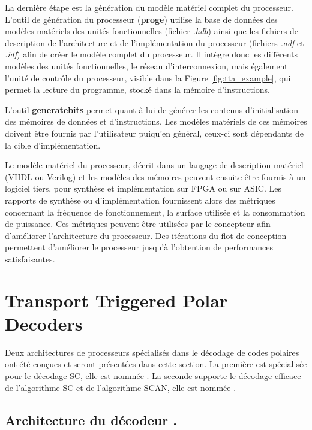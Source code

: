 La dernière étape est la génération du modèle matériel complet du processeur. L'outil de génération du processeur (\textbf{proge}) utilise la base de données des modèles matériels des unités fonctionnelles (fichier \textit{.hdb}) ainsi que les fichiers de description de l'architecture et de l'implémentation du processeur (fichiers \textit{.adf} et \textit{.idf}) afin de créer le modèle complet du processeur. Il intègre donc les différents modèles des unités fonctionnelles, le réseau d'interconnexion, mais également l'unité de contrôle du processeur, visible dans la Figure \ref{fig:tta_example}, qui permet la lecture du programme, stocké dans la mémoire d'instructions.

L'outil \textbf{generatebits} permet quant à lui de générer les contenus d'initialisation des mémoires de données et d'instructions. Les modèles matériels de ces mémoires doivent être fournis par l'utilisateur puiqu'en général, ceux-ci sont dépendants de la cible d'implémentation.

Le modèle matériel du processeur, décrit dans un langage de description matériel (VHDL ou Verilog) et les modèles des mémoires peuvent ensuite être fournis à un logiciel tiers, pour synthèse et implémentation sur FPGA ou sur ASIC. Les rapports de synthèse ou d'implémentation fournissent alors des métriques concernant la fréquence de fonctionnement, la surface utilisée et la consommation de puissance. Ces métriques peuvent être utilisées par le concepteur afin d'améliorer l'architecture du processeur. Des itérations du flot de conception permettent d'améliorer le processeur jusqu'à l'obtention de performances satisfaisantes.



\section{Transport Triggered Polar Decoders}
\label{sec:tta_design}

Deux architectures de processeurs spécialisés dans le décodage de codes polaires ont été conçues et seront présentées dans cette section. La première est spécialisée pour le décodage SC, elle est nommée \TTSC. La seconde supporte le décodage efficace de l'algorithme SC et de l'algorithme SCAN, elle est nommée \TTSCAN.

\subsection{Architecture du décodeur \TTSC.}

